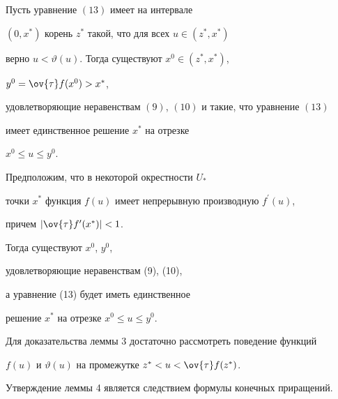 \begin{lem}


Пусть уравнение $(13)$ имеет на интервале


$(0, x^{*})$ корень $z^{*}$ такой, что для всех $u \in (z^{*}, x^{*})$


верно $u < \vartheta(u)$. Тогда существуют $x^{0} \in (z^{*}, x^{*})$,


$y^{0}=\ov{\tau} f(x^{0}) > x^{*}$,


удовлетворяющие неравенствам $(9)$, $(10)$ и такие, что уравнение $(13)$


имеет единственное решение $x^{*}$ на отрезке


$x^{0} \leq u \leq y^{0}$.


\end{lem}





\begin{lem}


Предположим, что в некоторой окрестности $U_{*}$


точки $x^{*}$ функция $f(u)$ имеет непрерывную производную $f^{\prime}(u)$,


причем $| \ov{\tau} f^{\prime}(x^{*}) | < 1$.


Тогда существуют $x^{0}$, $y^{0}$,


удовлетворяющие неравенствам (9), (10),


а уравнение (13) будет иметь единственное


решение $x^{*}$ на отрезке $x^{0} \leq u \leq y^{0}$.


\end{lem}





Для доказательства леммы 3 достаточно рассмотреть поведение функций


$f(u)$ и $\vartheta(u)$ на промежутке $z^{*} < u < \ov{\tau} f(z^{*})$.


Утверждение леммы 4 является следствием формулы конечных приращений.





